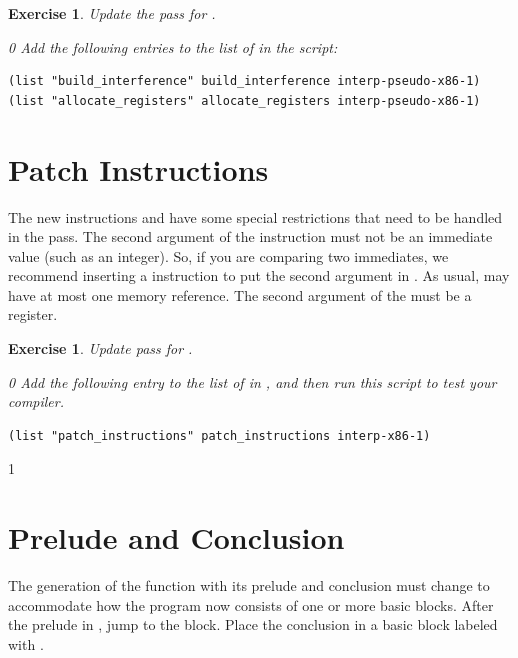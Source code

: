 \documentclass[7x10]{TimesAPriori_MIT}%
\def\racketEd{0}
\def\pythonEd{1}
\def\edition{1}
\newcommand{\pythonColor}[0]{}
\newtheorem{exercise}[theorem]{Exercise}
\numberwithin{theorem}{chapter}
\numberwithin{definition}{chapter}
\numberwithin{equation}{chapter}
\begin{document}
\begin{exercise}\normalfont\normalsize
Update the  pass for \LangXIfVar{}.
{\if\edition\racketEd
Add the following entries to the list of  in the
 script:
\begin{lstlisting}
(list "build_interference" build_interference interp-pseudo-x86-1)
(list "allocate_registers" allocate_registers interp-pseudo-x86-1)
\end{lstlisting}
\fi}
\end{exercise}


\section{Patch Instructions}

The new instructions  and  have some special
restrictions that need to be handled in the 
pass.
%
The second argument of the  instruction must not be an
immediate value (such as an integer). So, if you are comparing two
immediates, we recommend inserting a  instruction to put the
second argument in . As usual,  may have at most
one memory reference.
%
The second argument of the  must be a register.

\begin{exercise}\normalfont\normalsize
%
Update  pass for \LangXIfVar{}.
%  
{\if\edition\racketEd
Add the following entry to the list of  in
, and then run this script to test your compiler.
\begin{lstlisting}
(list "patch_instructions" patch_instructions interp-x86-1)
\end{lstlisting}
\fi}
\end{exercise}


{\if\edition\pythonEd\pythonColor
  
\section{Prelude and Conclusion}
\label{sec:prelude-conclusion-cond}

The generation of the  function with its prelude and
conclusion must change to accommodate how the program now consists of
one or more basic blocks. After the prelude in , jump to
the  block. Place the conclusion in a basic block labeled
with .

\fi}
\end{document}
